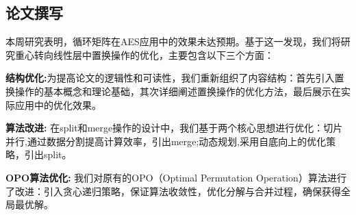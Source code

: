 \documentclass[11pt,a4paper]{article}
\begin{document}
\subsection{论文撰写}

本周研究表明，循环矩阵在AES应用中的效果未达预期。基于这一发现，我们将研究重心转向线性层中置换操作的优化，主要包含以下三个方面：

\textbf{结构优化:}为提高论文的逻辑性和可读性，我们重新组织了内容结构：首先引入置换操作的基本概念和理论基础，其次详细阐述置换操作的优化方法，最后展示在实际应用中的优化效果。

\textbf{算法改进:} 在split和merge操作的设计中，我们基于两个核心思想进行优化：切片并行,通过数据分割提高计算效率，引出merge;动态规划,采用自底向上的优化策略，引出split。

\textbf{OPO算法优化:} 我们对原有的OPO（Optimal Permutation Operation）算法进行了改进：引入贪心递归策略，保证算法收敛性，优化分解与合并过程，确保获得全局最优解。



\end{document}
